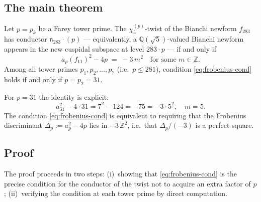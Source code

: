 \subsection{The main theorem}
\label{subsec:main-thm}

\begin{theorem}
\label{thm:frobenius}
Let $p = p_k$ be a Farey tower prime. The $\chi_5^{(p)}$-twist of the
Bianchi newform $f_{283}$ has conductor $\mathfrak{n}_{283} \cdot (p)$
--- equivalently, a $\mathbb{Q}(\sqrt{5})$-valued Bianchi newform appears
in the new cuspidal subspace at level $283 \cdot p$ --- if and only if
\begin{equation}
\label{eq:frobenius-cond}
  a_p(f_{11})^2 - 4p \;=\; -3\,m^2
  \quad \text{for some } m \in \mathbb{Z}.
\end{equation}
Among all tower primes $p_1, p_2, \ldots, p_7$ (i.e.\ $p \leq 281$),
condition \eqref{eq:frobenius-cond} holds if and only if $p = p_2 = 31$.
\end{theorem}

\begin{remark}
For $p = 31$ the identity is explicit:
\[
  a_{31}^2 - 4 \cdot 31 = 7^2 - 124 = -75 = -3 \cdot 5^2,
  \quad m = 5.
\]
The condition \eqref{eq:frobenius-cond} is equivalent to requiring that
the Frobenius discriminant $\Delta_p := a_p^2 - 4p$ lies in $-3\,\mathbb{Z}^2$,
i.e.\ that $\Delta_p / (-3)$ is a perfect square.
\end{remark}

\subsection{Proof}
\label{subsec:proof}

The proof proceeds in two steps: (i)~showing that
\eqref{eq:frobenius-cond} is the precise condition for the conductor of
the twist not to acquire an extra factor of $p$; (ii)~verifying the
condition at each tower prime by direct computation.

